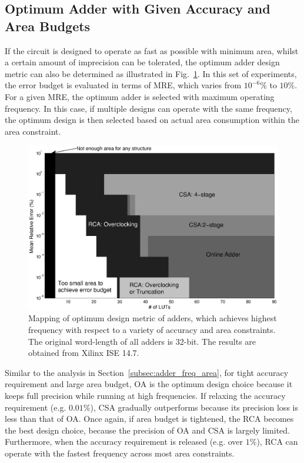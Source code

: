 \documentclass[10pt, conference, compsocconf]{IEEEtran}
\begin{document}
\subsection{Optimum Adder with Given Accuracy and Area Budgets}\label{subsec:adder_accuracy_area}
If the circuit is designed to operate as fast as possible with minimum area, whilst a certain amount of imprecision can be tolerated, the optimum adder design metric can also be determined as illustrated in Fig.~\ref{Fig:adder_3d_ErrorArea}. In this set of experiments, the error budget is evaluated in terms of MRE, which varies from $10^{-6}\%$ to $10\%$. For a given MRE, the optimum adder is selected with maximum operating frequency. In this case, if multiple designs can operate with the same frequency, the optimum design is then selected based on actual area consumption within the area constraint.
%
\begin{figure}[tbp]
  \centering
  \includegraphics[width=.7\textwidth]{./figures/exp/3d_ErrorArea.eps}
  \vspace{-3ex}
  \caption{Mapping of optimum design metric of adders, which achieves highest frequency with respect to a variety of accuracy and area constraints. The original word-length of all adders is 32-bit. The results are obtained from Xilinx ISE 14.7.}
  \label{Fig:adder_3d_ErrorArea}
\end{figure}

Similar to the analysis in Section~\ref{subsec:adder_freq_area}, for tight accuracy requirement and large area budget, OA is the optimum design choice because it keeps full precision while running at high frequencies. If relaxing the accuracy requirement (e.g. $0.01\%$), CSA gradually outperforms because its precision loss is less than that of OA. Once again, if area budget is tightened, the RCA becomes the best design choice, because the precision of OA and CSA is largely limited. Furthermore, when the accuracy requirement is released (e.g. over $1\%$), RCA can operate with the fastest frequency across most area constraints.
\end{document}
